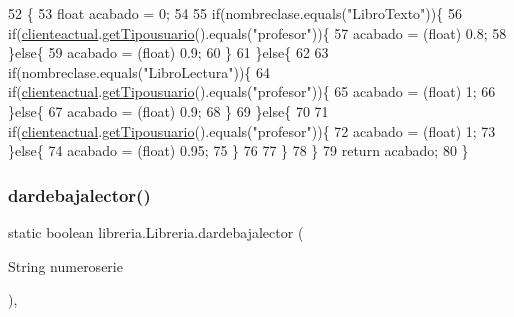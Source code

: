 \begin{DoxyCode}
52                                                               \{
53         \textcolor{keywordtype}{float} acabado = 0;
54         
55         \textcolor{keywordflow}{if}(nombreclase.equals(\textcolor{stringliteral}{"LibroTexto"}))\{
56             \textcolor{keywordflow}{if}(\mbox{\hyperlink{classlibreria_1_1_libreria_afcc53a4ee673ee845bc07288aa5c7181}{clienteactual}}.\mbox{\hyperlink{classlibreria_1_1_cliente_a3111aacdea652c8dd96664c643c3c52a}{getTipousuario}}().equals(\textcolor{stringliteral}{"profesor"}))\{
57                 acabado = (float) 0.8;
58             \}\textcolor{keywordflow}{else}\{
59                 acabado = (float) 0.9;
60             \}
61         \}\textcolor{keywordflow}{else}\{
62             
63             \textcolor{keywordflow}{if}(nombreclase.equals(\textcolor{stringliteral}{"LibroLectura"}))\{
64                 \textcolor{keywordflow}{if}(\mbox{\hyperlink{classlibreria_1_1_libreria_afcc53a4ee673ee845bc07288aa5c7181}{clienteactual}}.\mbox{\hyperlink{classlibreria_1_1_cliente_a3111aacdea652c8dd96664c643c3c52a}{getTipousuario}}().equals(\textcolor{stringliteral}{"profesor"}))\{
65                     acabado = (float) 1;
66                 \}\textcolor{keywordflow}{else}\{
67                     acabado = (float) 0.9;
68                 \}
69             \}\textcolor{keywordflow}{else}\{
70                 
71                     \textcolor{keywordflow}{if}(\mbox{\hyperlink{classlibreria_1_1_libreria_afcc53a4ee673ee845bc07288aa5c7181}{clienteactual}}.\mbox{\hyperlink{classlibreria_1_1_cliente_a3111aacdea652c8dd96664c643c3c52a}{getTipousuario}}().equals(\textcolor{stringliteral}{"profesor"}))\{
72                         acabado = (float) 1;
73                     \}\textcolor{keywordflow}{else}\{
74                         acabado = (float) 0.95;
75                     \}
76                 
77             \}
78         \}
79         \textcolor{keywordflow}{return} acabado;
80     \}
\end{DoxyCode}
\mbox{\label{classlibreria_1_1_libreria_a6ebb6d0b3c9f63404c54ffe69d67d495}} 
\subsubsection{\texorpdfstring{dardebajalector()}{dardebajalector()}}
{\footnotesize\ttfamily static boolean libreria.\+Libreria.\+dardebajalector (\begin{DoxyParamCaption}\item[{String}]{numeroserie }\end{DoxyParamCaption})\hspace{0.3cm}{\ttfamily [inline]}, {\ttfamily [static]}}

